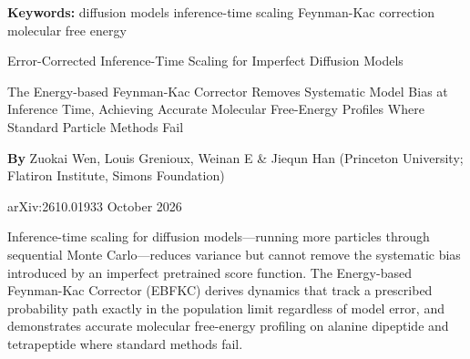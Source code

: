 \documentclass[10pt,twocolumn]{article}
\begin{document}
\setlength{\parindent}{0pt}
\setlength{\parskip}{4pt}

{\small\color{keywordgray}\textbf{Keywords:}
  diffusion models \textbullet{}
  inference-time scaling \textbullet{}
  Feynman-Kac correction \textbullet{}
  molecular free energy}\par\vspace{4pt}

{\LARGE\bfseries\raggedright
  Error-Corrected Inference-Time Scaling for Imperfect Diffusion Models}\par\vspace{4pt}

{\large\itshape\raggedright
  The Energy-based Feynman-Kac Corrector Removes Systematic Model Bias
  at Inference Time, Achieving Accurate Molecular Free-Energy Profiles
  Where Standard Particle Methods Fail}\par\vspace{6pt}

{\small\textbf{By} Zuokai Wen, Louis Grenioux, Weinan E \& Jiequn Han
  (Princeton University; Flatiron Institute, Simons Foundation)}\par\vspace{2pt}

{\small\color{keywordgray}arXiv:2610.01933 \textbullet{} October 2026}
\par\vspace{2pt}\noindent{\color{rulered}\rule{\columnwidth}{0.6pt}}\vspace{6pt}

Inference-time scaling for diffusion models---running more particles through sequential
Monte Carlo---reduces variance but cannot remove the systematic bias introduced by an
imperfect pretrained score function. The Energy-based Feynman-Kac Corrector (EBFKC)
derives dynamics that track a prescribed probability path exactly in the population limit
regardless of model error, and demonstrates accurate molecular free-energy profiling
on alanine dipeptide and tetrapeptide where standard methods fail.
\end{document}
